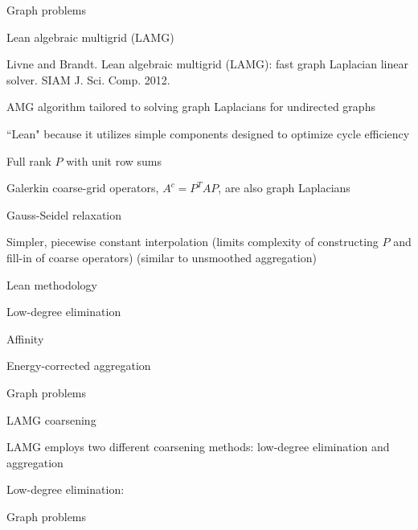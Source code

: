 \documentclass[18pt,xcolor=table]{beamer}
\begin{document}
\begin{frame}{Graph problems}
\begin{block}{Lean algebraic multigrid (LAMG)}
\bit
\item Livne and Brandt. Lean algebraic multigrid (LAMG): fast graph Laplacian linear solver. SIAM J. Sci. Comp. 2012.
\item AMG algorithm tailored to solving graph Laplacians for undirected graphs
\item ``Lean" because it utilizes simple components designed to optimize cycle efficiency
\bit
\item Full rank $P$ with unit row sums
\item Galerkin coarse-grid operators, $A^c = P^TAP$, are also graph Laplacians
\item Gauss-Seidel relaxation
\item Simpler, piecewise constant interpolation (limits complexity of constructing $P$ and fill-in of coarse operators) (similar to unsmoothed aggregation)
\item Lean methodology
\item Low-degree elimination
\item Affinity
\item Energy-corrected aggregation
\eit
\eit
\end{block}
\end{frame}

\begin{frame}{Graph problems}
\begin{block}{LAMG coarsening}
\bit
\item LAMG employs two different coarsening methods: low-degree elimination and aggregation
\item Low-degree elimination:
\eit
\end{block}
\end{frame}

\begin{frame}{Graph problems}
\begin{block}{}
\bit
\item 
\eit
\end{block}
\end{frame}



\end{document}
